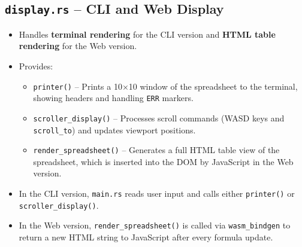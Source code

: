 \documentclass[12pt]{article}
\begin{document}
    \subsection{\texttt{display.rs} – CLI and Web Display}
    \begin{itemize}
        \item Handles \textbf{terminal rendering} for the CLI version and \textbf{HTML table rendering} for the Web version.
        \item Provides:
        \begin{itemize}
            \item \texttt{printer()} – Prints a 10×10 window of the spreadsheet to the terminal, showing headers and handling \texttt{ERR} markers.
            \item \texttt{scroller\_display()} – Processes scroll commands (WASD keys and \texttt{scroll\_to}) and updates viewport positions.
            \item \texttt{render\_spreadsheet()} – Generates a full HTML table view of the spreadsheet, which is inserted into the DOM by JavaScript in the Web version.
        \end{itemize}
        \item In the CLI version, \texttt{main.rs} reads user input and calls either \texttt{printer()} or \texttt{scroller\_display()}.
        \item In the Web version, \texttt{render\_spreadsheet()} is called via \texttt{wasm\_bindgen} to return a new HTML string to JavaScript after every formula update.
    \end{itemize}
\end{document}
